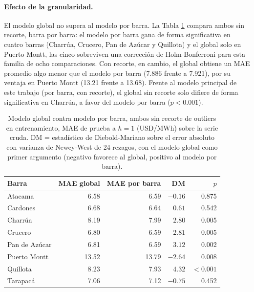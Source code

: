 \paragraph{Efecto de la granularidad.} El modelo global no supera al modelo por barra. La Tabla \ref{tab:global_vs_barra_sin} compara ambos sin recorte, barra por barra: el modelo por barra gana de forma significativa en cuatro barras (Charrúa, Crucero, Pan de Azúcar y Quillota) y el global solo en Puerto Montt, las cinco sobreviven una corrección de Holm-Bonferroni para esta familia de ocho comparaciones. Con recorte, en cambio, el global obtiene un MAE promedio algo menor que el modelo por barra (7.886 frente a 7.921), por su ventaja en Puerto Montt (13.21 frente a 13.68). Frente al modelo principal de este trabajo (por barra, con recorte), el global sin recorte solo difiere de forma significativa en Charrúa, a favor del modelo por barra ($p<0.001$).

\begin{table}[htbp]
    \centering
    \begin{tabular}{lrrrr}
        \toprule
        Barra & MAE global & MAE por barra & DM & $p$ \\
        \midrule
        Atacama       & 6.58  & 6.59  & $-0.16$ & 0.875    \\
        Cardones      & 6.68  & 6.64  & $0.61$  & 0.542    \\
        Charrúa       & 8.19  & 7.99  & $2.80$  & 0.005    \\
        Crucero       & 6.80  & 6.59  & $2.81$  & 0.005    \\
        Pan de Azúcar & 6.81  & 6.59  & $3.12$  & 0.002    \\
        Puerto Montt  & 13.52 & 13.79 & $-2.64$ & 0.008    \\
        Quillota      & 8.23  & 7.93  & $4.32$  & $<0.001$ \\
        Tarapacá      & 7.06  & 7.12  & $-0.75$ & 0.452    \\
        \bottomrule
    \end{tabular}
    \vspace{0.2cm}
    \caption{Modelo global contra modelo por barra, ambos sin recorte de outliers en entrenamiento, MAE de prueba a $h=1$ (USD/MWh) sobre la serie cruda. DM = estadístico de Diebold-Mariano sobre el error absoluto con varianza de Newey-West de 24 rezagos, con el modelo global como primer argumento (negativo favorece al global, positivo al modelo por barra).}
    \label{tab:global_vs_barra_sin}
\end{table}

